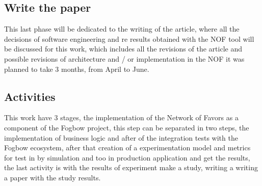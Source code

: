 \documentclass{article}
\begin{document}
\subsection{Write the paper}
    This last phase will be dedicated to the writing of the article, where all the decisions of software engineering and re results obtained with the NOF tool will be discussed for this work, which includes all the revisions of the article and possible revisions of architecture and / or implementation in the NOF it was planned to take 3 months, from April to June.

\subsection{Activities}
This work have 3 stages, the implementation of the Network of Favors as a component of the Fogbow project, this step can be separated in two steps, the implementation of business logic and after of the integration tests with the Fogbow ecosystem, after that creation of a experimentation model and metrics for test in by simulation and too in production application and get the results, the last activity is with the results of experiment make a study, writing a writing a paper with the study results.
\end{document}
